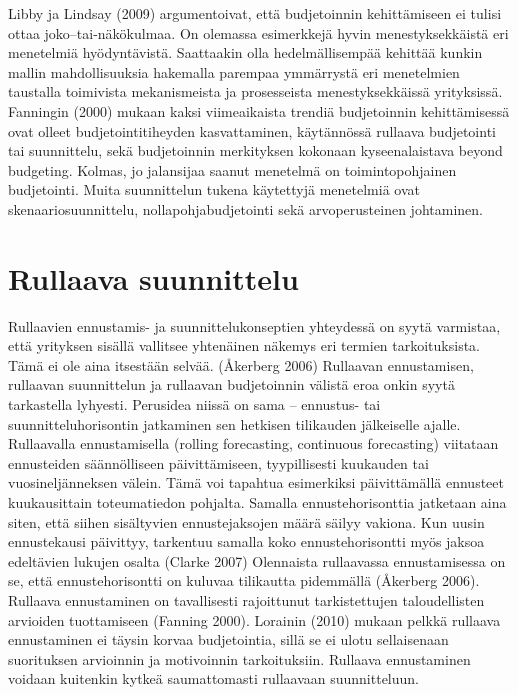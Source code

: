 \documentclass[12pt,a4paper,oneside,pdftex]{report}
\begin{document}
Libby ja Lindsay (2009) argumentoivat, että budjetoinnin kehittämiseen ei tulisi ottaa joko–tai-näkökulmaa. On olemassa esimerkkejä hyvin menestyksekkäistä eri menetelmiä hyödyntävistä. Saattaakin olla hedelmällisempää kehittää kunkin mallin mahdollisuuksia hakemalla parempaa ymmärrystä eri menetelmien taustalla toimivista mekanismeista ja prosesseista menestyksekkäissä yrityksissä. Fanningin (2000) mukaan kaksi viimeaikaista trendiä budjetoinnin kehittämisessä ovat olleet budjetointitiheyden kasvattaminen, käytännössä rullaava budjetointi tai suunnittelu, sekä budjetoinnin merkityksen kokonaan kyseenalaistava beyond budgeting. Kolmas, jo jalansijaa saanut menetelmä on toimintopohjainen budjetointi. Muita suunnittelun tukena käytettyjä menetelmiä ovat skenaariosuunnittelu, nollapohjabudjetointi sekä arvoperusteinen johtaminen.

\section{Rullaava suunnittelu}

Rullaavien ennustamis- ja suunnittelukonseptien yhteydessä on syytä varmistaa, että yrityksen sisällä vallitsee yhtenäinen näkemys eri termien tarkoituksista. Tämä ei ole aina itsestään selvää. (Åkerberg 2006) Rullaavan ennustamisen, rullaavan suunnittelun ja rullaavan budjetoinnin välistä eroa onkin syytä tarkastella lyhyesti. Perusidea niissä on sama – ennustus- tai suunnitteluhorisontin jatkaminen sen hetkisen tilikauden jälkeiselle ajalle.
Rullaavalla ennustamisella (rolling forecasting, continuous forecasting) viitataan ennusteiden säännölliseen päivittämiseen, tyypillisesti kuukauden tai vuosineljänneksen välein. Tämä voi tapahtua esimerkiksi päivittämällä ennusteet kuukausittain toteumatiedon pohjalta. Samalla ennustehorisonttia jatketaan aina siten, että siihen sisältyvien ennustejaksojen määrä säilyy vakiona. Kun uusin ennustekausi päivittyy,  tarkentuu samalla koko ennustehorisontti myös jaksoa edeltävien lukujen osalta (Clarke 2007) Olennaista rullaavassa ennustamisessa on se, että ennustehorisontti on kuluvaa tilikautta pidemmällä (Åkerberg 2006). Rullaava ennustaminen on tavallisesti rajoittunut tarkistettujen taloudellisten arvioiden tuottamiseen (Fanning 2000).
Lorainin (2010) mukaan pelkkä rullaava ennustaminen ei täysin korvaa budjetointia, sillä se ei ulotu sellaisenaan suorituksen arvioinnin ja motivoinnin tarkoituksiin. Rullaava ennustaminen voidaan kuitenkin kytkeä saumattomasti rullaavaan suunnitteluun.
\end{document}
